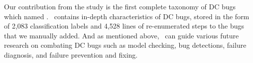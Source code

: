 Our contribution from the study is the first complete taxonomy of DC bugs which
named \taxdc. \taxdc\ contains in-depth characteristics of DC bugs, stored in
the form of 2,083 classification labels and 4,528 lines of re-enumerated steps
to the bugs that we manually added. And as mentioned above, \taxdc\ can guide
various future research on combating DC bugs such as model checking, bug
detections, failure diagnosis, and failure prevention and fixing.

